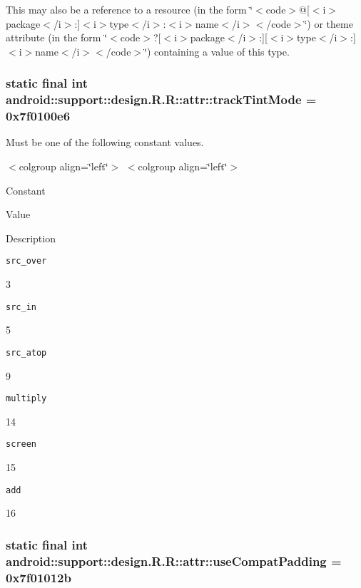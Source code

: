 This may also be a reference to a resource (in the form \char`\"{}$<$code$>$@\mbox{[}$<$i$>$package$<$/i$>$:\mbox{]}$<$i$>$type$<$/i$>$:$<$i$>$name$<$/i$>$$<$/code$>$\char`\"{}) or theme attribute (in the form \char`\"{}$<$code$>$?\mbox{[}$<$i$>$package$<$/i$>$:\mbox{]}\mbox{[}$<$i$>$type$<$/i$>$:\mbox{]}$<$i$>$name$<$/i$>$$<$/code$>$\char`\"{}) containing a value of this type. \hypertarget{classandroid_1_1support_1_1design_1_1_r_1_1attr_a09000e25dfccb313702dc0fcef38dd4}{
\subsubsection[{trackTintMode}]{\setlength{\rightskip}{0pt plus 5cm}static final int android::support::design.R.R::attr::trackTintMode = 0x7f0100e6}}
\label{classandroid_1_1support_1_1design_1_1_r_1_1attr_a09000e25dfccb313702dc0fcef38dd4}


Must be one of the following constant values. \begin{TabularC}{0}
\hline
\end{TabularC}
$<$colgroup align=\char`\"{}left\char`\"{}$>$ $<$colgroup align=\char`\"{}left\char`\"{}$>$ 

Constant

Value

Description 

{\tt src\_\-over}

3

{\tt src\_\-in}

5

{\tt src\_\-atop}

9

{\tt multiply}

14

{\tt screen}

15

{\tt add}

16\hypertarget{classandroid_1_1support_1_1design_1_1_r_1_1attr_696afa396d827c4f9b0d0e5e33e656d6}{
\subsubsection[{useCompatPadding}]{\setlength{\rightskip}{0pt plus 5cm}static final int android::support::design.R.R::attr::useCompatPadding = 0x7f01012b}}
\label{classandroid_1_1support_1_1design_1_1_r_1_1attr_696afa396d827c4f9b0d0e5e33e656d6}



